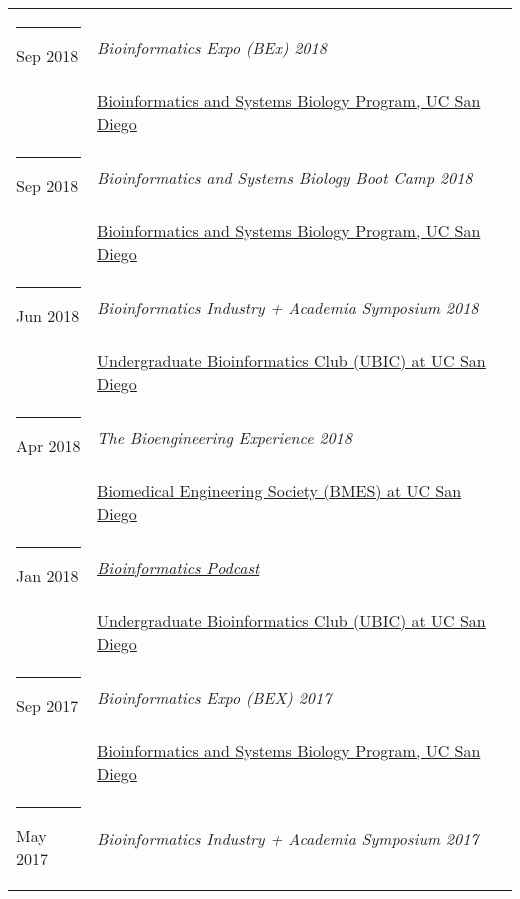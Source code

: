 \documentclass[margin,line]{res}
\begin{document}
\begin{resume}
\begin{longtable}{@{}p{0.7in}p{4in}}
\hspace*{-4mm} \rule{-1mm}{5mm} Sep 2018 & \textit{Bioinformatics Expo (BEx) 2018}\\*
\hspace*{-4mm} & \hspace{4mm} \href{http://bioinformatics.ucsd.edu/}{Bioinformatics and Systems Biology Program, UC San Diego}\\
\hspace*{-4mm} \rule{-1mm}{5mm} Sep 2018 & \textit{Bioinformatics and Systems Biology Boot Camp 2018}\\*
\hspace*{-4mm} & \hspace{4mm} \href{http://bioinformatics.ucsd.edu/}{Bioinformatics and Systems Biology Program, UC San Diego}\\
\hspace*{-4mm} \rule{-1mm}{5mm} Jun 2018 & \textit{Bioinformatics Industry + Academia Symposium 2018}\\*
\hspace*{-4mm} & \hspace{4mm} \href{http://ubicucsd.github.io/}{Undergraduate Bioinformatics Club (UBIC) at UC San Diego}\\
\hspace*{-4mm} \rule{-1mm}{5mm} Apr 2018 & \textit{The Bioengineering Experience 2018}\\*
\hspace*{-4mm} & \hspace{4mm} \href{http://bmes.ucsd.edu/}{Biomedical Engineering Society (BMES) at UC San Diego}\\
\hspace*{-4mm} \rule{-1mm}{5mm} Jan 2018 & \href{https://soundcloud.com/ubicucsd/ubic-podcast-episode-1}{\textit{Bioinformatics Podcast}}\\*
\hspace*{-4mm} & \hspace{4mm} \href{http://ubicucsd.github.io/}{Undergraduate Bioinformatics Club (UBIC) at UC San Diego}\\
\hspace*{-4mm} \rule{-1mm}{5mm} Sep 2017 & \textit{Bioinformatics Expo (BEX) 2017}\\*
\hspace*{-4mm} & \hspace{4mm} \href{http://bioinformatics.ucsd.edu/}{Bioinformatics and Systems Biology Program, UC San Diego}\\
\hspace*{-4mm} \rule{-1mm}{5mm} May 2017 & \textit{Bioinformatics Industry + Academia Symposium 2017}\\*

\end{longtable}
\end{resume}
\end{document}
